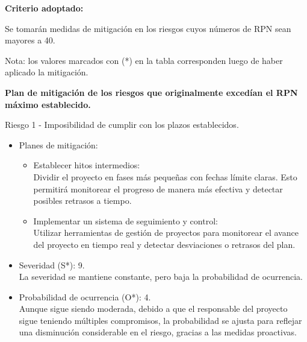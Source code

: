 \textbf{Criterio adoptado:}

Se tomarán medidas de mitigación en los riesgos cuyos números de RPN sean
mayores a 40.

Nota: los valores marcados con (*) en la tabla corresponden luego de haber
aplicado la mitigación.

\textbf{Plan de mitigación de los riesgos que originalmente excedían el RPN máximo
	establecido.}

Riesgo 1 - Imposibilidad de cumplir con los plazos establecidos.
\begin{itemize}
	\item Planes de mitigación:\\
	      \begin{itemize}
		      \item Establecer hitos intermedios:\\ Dividir el proyecto en fases más pequeñas con
		            fechas límite claras. Esto permitirá monitorear el progreso de manera más
		            efectiva y detectar posibles retrasos a tiempo.
		      \item Implementar un sistema de seguimiento y control:\\ Utilizar herramientas de
		            gestión de proyectos para monitorear el avance del proyecto en tiempo real y
		            detectar desviaciones o retrasos del plan.
	      \end{itemize}
	\item Severidad (S*): 9.\\ La severidad se mantiene constante, pero baja la probabilidad de ocurrencia.
	\item Probabilidad de ocurrencia (O*): 4.\\ Aunque sigue siendo moderada, debido a que
	      el responsable del proyecto sigue teniendo múltiples compromisos, la
	      probabilidad se ajusta para reflejar una disminución considerable en el riesgo,
	      gracias a las medidas proactivas.
\end{itemize}

\pagebreak

